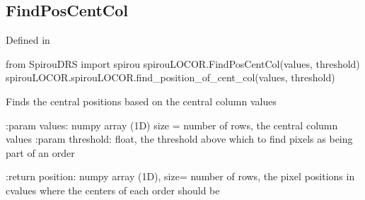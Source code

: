 \begin{minipage}{\textwidth}
\subsection{FindPosCentCol}

Defined in \spirouLOCOR{}

\begin{pythonbox}
from SpirouDRS import spirou
spirouLOCOR.FindPosCentCol(values, threshold)
spirouLOCOR.spirouLOCOR.find_position_of_cent_col(values, threshold)
\end{pythonbox}

\begin{pythondocstring}
Finds the central positions based on the central column values

:param values: numpy array (1D) size = number of rows,
                the central column values
:param threshold: float, the threshold above which to find pixels as being
                  part of an order

:return position: numpy array (1D), size= number of rows,
                  the pixel positions in cvalues where the centers of each
                  order should be
\end{pythondocstring}
\end{minipage}

